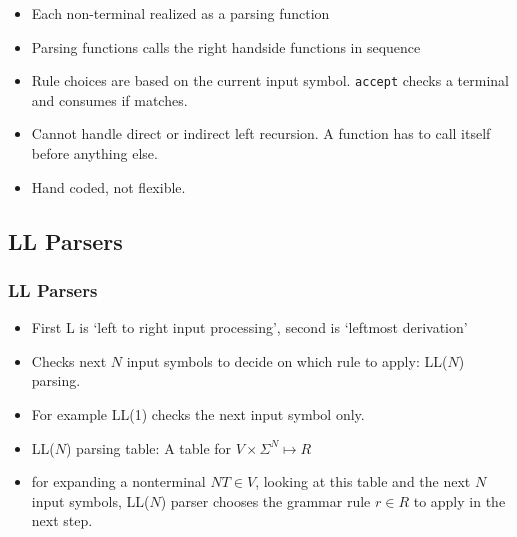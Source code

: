 \begin{frame}
\begin{itemize}
\item Each non-terminal realized as a parsing function
\item Parsing functions calls the right handside functions in sequence
\item Rule choices are based on the current input symbol. \texttt{accept}
	checks a terminal and consumes if matches.
\item Cannot handle direct or indirect left recursion. A function has to call 
	itself before anything else.
\item Hand coded, not flexible.
\end{itemize}
\end{frame}

\begin{frame}
\subsection{LL Parsers}
\frametitle{LL Parsers}
\begin{itemize}
\item First L is `left to right input processing', second is 
	`leftmost derivation'
\item Checks next $N$ input symbols to decide on which rule to apply: LL($N$) parsing.
\item For example LL(1) checks the next input symbol only.
\item LL($N$) parsing table: A table for $V \times \Sigma^{N} \mapsto R$
\item for expanding a nonterminal $NT \in V$, looking at this table and the next $N$ input symbols, LL($N$) parser chooses the grammar rule $r \in R$ to apply in the next step.
\end{itemize}
\end{frame}

